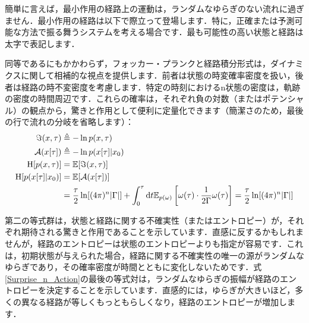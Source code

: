 \documentclass[a4paper, titlepage]{jsarticle}
\begin{document}
\par
簡単に言えば，最小作用の経路上の運動は，ランダムなゆらぎのない流れに過ぎません．最小作用の経路は以下で際立って登場します．特に，正確または予測可能な方法で振る舞うシステムを考える場合です．最も可能性の高い状態と経路は太字で表記します．
\par
同等であるにもかかわらず，フォッカー・プランクと経路積分形式は，ダイナミクスに関して相補的な視点を提供します．前者は状態の時変確率密度を扱い，後者は経路の時不変密度を考慮します．特定の時刻におけるn状態の密度は，軌跡の密度の時間周辺です．これらの確率は，それぞれ負の対数（またはポテンシャル）の観点から，驚きと作用として便利に定量化できます（簡潔さのため，最後の行で流れの分岐を省略します）：
\begin{equation}\label{Surprise_n_Action}
    \begin{aligned}
        \imaginary(x, \tau)&\triangleq-\ln p(x, \tau) \\
        \mathcal{A}(x[\tau])&\triangleq -\ln p(x[\tau] | x_0) \\
        \mathrm{H}[p(x, \tau)] &= \mathbb{E}[\imaginary(x, \tau)] \\
        \mathrm{H}[p(x[\tau] | x_0)] &= \mathbb{E}[\mathcal{A}(x[\tau])] \\
        &= \frac{\tau}{2} \ln [(4\pi)^n |\Gamma|] + \int_0^\tau \mathrm{d}t \mathbb{E}_{p(\omega)} \left[\omega(\tau)\cdot\frac{1}{2\Gamma} \omega(\tau)\right] = \frac{\tau}{2} \ln [(4\pi)^n |\Gamma|]
    \end{aligned}
\end{equation}
\par
第二の等式群は，状態と経路に関する不確実性（またはエントロピー）が，それぞれ期待される驚きと作用であることを示しています．直感に反するかもしれませんが，経路のエントロピーは状態のエントロピーよりも指定が容易です．これは，初期状態が与えられた場合，経路に関する不確実性の唯一の源がランダムなゆらぎであり，その確率密度が時間とともに変化しないためです．式\eqref{Surprise_n_Action}の最後の等式対は，ランダムなゆらぎの振幅が経路のエントロピーを決定することを示しています．直感的には，ゆらぎが大きいほど，多くの異なる経路が等しくもっともらしくなり，経路のエントロピーが増加します．
\end{document}
